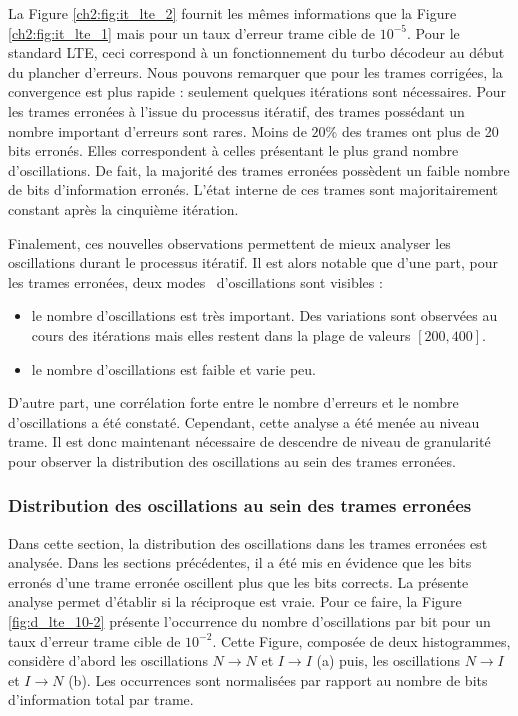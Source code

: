 La Figure \ref{ch2:fig:it_lte_2} fournit les mêmes informations que la Figure \ref{ch2:fig:it_lte_1} mais pour un 
taux d'erreur trame cible de $10^{-5}$. Pour le standard LTE, ceci correspond à un fonctionnement du 
turbo décodeur au début du plancher d'erreurs. Nous pouvons remarquer que pour les trames corrigées, la convergence est 
plus rapide : seulement quelques itérations sont nécessaires. Pour les trames erronées à l'issue 
du processus itératif, des trames possédant un nombre important d'erreurs sont rares. Moins de $20\%$ des trames ont plus de
20 bits erronés. Elles correspondent à celles 
présentant le plus grand nombre d'oscillations. De fait, la majorité des trames erronées possèdent un faible nombre 
de bits d'information erronés. L'état interne de ces trames sont majoritairement constant après la cinquième itération.

Finalement, ces nouvelles observations permettent de mieux analyser les oscillations durant le processus itératif. Il est alors 
notable que d'une part, pour les trames erronées, deux \og modes \fg ~d'oscillations sont visibles :
\begin{itemize}
	\item le nombre d'oscillations est très important. Des variations sont observées au cours des itérations mais elles 
	restent dans la plage de valeurs $[200,400]$.
	\item le nombre d'oscillations est faible et varie peu.
\end{itemize}

D'autre part, une corrélation forte entre le nombre d'erreurs et le nombre d'oscillations a été constaté. Cependant, 
cette analyse a été menée au niveau trame. Il est donc maintenant nécessaire de descendre de niveau de granularité pour observer 
la distribution des oscillations au sein des trames erronées.



\subsubsection{Distribution des oscillations au sein des trames erronées} 
Dans cette section, la distribution des oscillations dans les trames erronées est analysée. Dans les sections précédentes,
il a été mis en évidence que les bits erronés d'une trame erronée oscillent plus que les bits corrects. La présente analyse permet
d'établir si la réciproque est vraie. Pour ce faire, la Figure \ref{fig:d_lte_10-2} présente l’occurrence du nombre d'oscillations par bit pour un taux 
d'erreur trame cible de $10^{-2}$. Cette Figure, composée de deux histogrammes, considère d'abord les oscillations $N\rightarrow N$ et 
$I\rightarrow I$ (a) puis, les oscillations $N\rightarrow I$ et $I\rightarrow N$ (b). Les occurrences sont normalisées 
par rapport au nombre de bits d'information total par trame.

